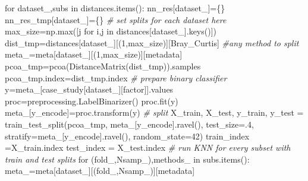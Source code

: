 \documentclass[
]{article}
\newenvironment{Shaded}{}{}
\newcommand{\BuiltInTok}[1]{\textcolor[rgb]{0.65,0.15,0.64}{#1}}
\newcommand{\CommentTok}[1]{\textcolor[rgb]{0.63,0.63,0.65}{\textit{#1}}}
\newcommand{\ControlFlowTok}[1]{\textcolor[rgb]{0.65,0.15,0.64}{#1}}
\newcommand{\DecValTok}[1]{\textcolor[rgb]{0.60,0.41,0.00}{#1}}
\newcommand{\FloatTok}[1]{\textcolor[rgb]{0.60,0.41,0.00}{#1}}
\newcommand{\KeywordTok}[1]{\textcolor[rgb]{0.65,0.15,0.64}{#1}}
\newcommand{\NormalTok}[1]{\textcolor[rgb]{0.22,0.23,0.26}{#1}}
\newcommand{\OperatorTok}[1]{\textcolor[rgb]{0.65,0.15,0.64}{#1}}
\newcommand{\StringTok}[1]{\textcolor[rgb]{0.31,0.63,0.31}{#1}}
\begin{document}
\begin{Shaded}
\begin{Highlighting}[numbers=left,,firstnumber=123,]
\ControlFlowTok{for}\NormalTok{ dataset\_,subs }\KeywordTok{in}\NormalTok{ distances.items():}
\NormalTok{  nn\_res[dataset\_]}\OperatorTok{=}\NormalTok{\{\}}
\NormalTok{  nn\_res\_tmp[dataset\_]}\OperatorTok{=}\NormalTok{\{\}}
  \CommentTok{\# set splits for each dataset here}
\NormalTok{  max\_size}\OperatorTok{=}\NormalTok{np.}\BuiltInTok{max}\NormalTok{([j }\ControlFlowTok{for}\NormalTok{ i,j }\KeywordTok{in}\NormalTok{ distances[dataset\_].keys()])}
\NormalTok{  dist\_tmp}\OperatorTok{=}\NormalTok{distances[dataset\_][(}\DecValTok{1}\NormalTok{,max\_size)][}\StringTok{\textquotesingle{}Bray\_Curtis\textquotesingle{}}\NormalTok{] }\CommentTok{\#any method to split}
\NormalTok{  meta\_}\OperatorTok{=}\NormalTok{meta[dataset\_][(}\DecValTok{1}\NormalTok{,max\_size)][}\StringTok{\textquotesingle{}metadata\textquotesingle{}}\NormalTok{]}
\NormalTok{  pcoa\_tmp}\OperatorTok{=}\NormalTok{pcoa(DistanceMatrix(dist\_tmp)).samples}
\NormalTok{  pcoa\_tmp.index}\OperatorTok{=}\NormalTok{dist\_tmp.index}
  \CommentTok{\# prepare binary classifier }
\NormalTok{  y}\OperatorTok{=}\NormalTok{meta\_[case\_study[dataset\_][}\StringTok{\textquotesingle{}factor\textquotesingle{}}\NormalTok{]].values}
\NormalTok{  proc}\OperatorTok{=}\NormalTok{preprocessing.LabelBinarizer()}
\NormalTok{  proc.fit(y)}
\NormalTok{  meta\_[}\StringTok{\textquotesingle{}y\_encode\textquotesingle{}}\NormalTok{]}\OperatorTok{=}\NormalTok{proc.transform(y)}
  \CommentTok{\# split}
\NormalTok{  X\_train, X\_test, y\_train, y\_test }\OperatorTok{=}\NormalTok{ train\_test\_split(pcoa\_tmp, meta\_[}\StringTok{\textquotesingle{}y\_encode\textquotesingle{}}\NormalTok{].ravel(), }
\NormalTok{                                                      test\_size}\OperatorTok{=}\FloatTok{.4}\NormalTok{, }
\NormalTok{                                                      stratify}\OperatorTok{=}\NormalTok{meta\_[}\StringTok{\textquotesingle{}y\_encode\textquotesingle{}}\NormalTok{].ravel(), }
\NormalTok{                                                      random\_state}\OperatorTok{=}\DecValTok{42}\NormalTok{)}
\NormalTok{  train\_index }\OperatorTok{=}\NormalTok{X\_train.index}
\NormalTok{  test\_index }\OperatorTok{=}\NormalTok{ X\_test.index}
  \CommentTok{\# run KNN for every subset with train and test splits}
  \ControlFlowTok{for}\NormalTok{ (fold\_,Nsamp\_),methods\_ }\KeywordTok{in}\NormalTok{ subs.items():}
\NormalTok{    meta\_}\OperatorTok{=}\NormalTok{meta[dataset\_][(fold\_,Nsamp\_)][}\StringTok{\textquotesingle{}metadata\textquotesingle{}}\NormalTok{]}

\end{Highlighting}
\end{Shaded}
\end{document}
